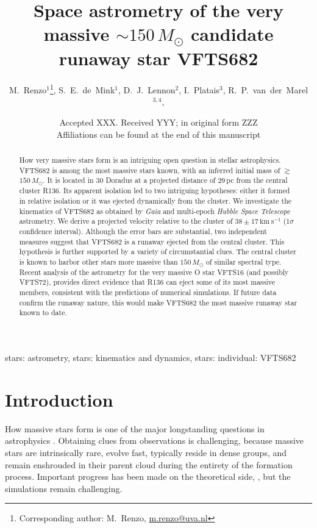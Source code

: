 \documentclass[a4paper,fleqn,usenatbib]{mnras}
\title[Space astrometry of the very massive $\sim$$150\,M_\odot$ candidate runaway star VFTS682]{Space astrometry of the very massive $\sim$$150\,M_\odot$  candidate runaway star VFTS682}
\author[Renzo et al.]{M.~Renzo$^{1}$\thanks{Corresponding author:
    M.~Renzo, \href{mailto:m.renzo@uva.nl}{m.renzo@uva.nl}}, S.~E.~de~Mink$^{1}$, D.~J.~Lennon$^{2}$, I.~Platais$^{3}$,
  R.~P.~van~der~Marel$^{3,4}$,
  \newauthor{E.~Laplace$^{1}$, J.~M.~Bestenlehner$^{5}$, C.~J.~Evans$^{6}$,
    V.~H\'enault-Brunet$^{7}$,  S.~Justham$^{8,9,1}$,
  }
\newauthor{A.~de~Koter$^{1}$,
      N.~Langer$^{10}$, F. Najarro$^{11}$, H.~Sana$^{12}$, F.~R.~N.~Schneider$^{13}$, J.~S.~Vink$^{14}$}}
\date{Accepted XXX. Received YYY; in original form ZZZ \\ Affiliations
can be found at the end of this manuscript}
\newcommand{\kms}{{\,\mathrm{km\ s^{-1}}}}
\begin{document}
\label{firsxtpage}
\pagerange{\pageref{firstpage}--\pageref{lastpage}}
\maketitle

\begin{abstract}
 
How very massive stars form is an intriguing open question in
stellar astrophysics.  VFTS682 is among the most massive stars known,
with an inferred initial mass of $\gtrsim$$150\,M_\odot$. It is located
in 30 Doradus at a projected distance of 29\,pc from the central
cluster R136. 
Its apparent isolation led to two intriguing hypotheses: 
either it formed in relative isolation 
or it was ejected dynamically from the cluster. 
We investigate the kinematics of
VFTS682 as obtained by \emph{Gaia} and multi-epoch \emph{Hubble Space Telescope} astrometry. We derive a projected velocity relative to
the cluster of $38\pm17\kms$ ($1\sigma$ confidence interval). Although
the error bars are substantial, two independent measures
suggest that VFTS682 is a runaway
ejected from the central cluster. This hypothesis is further supported by a variety of
circumstantial clues. The central cluster is known to harbor 
other stars more massive than $150\,M_\odot$ of similar spectral
type. Recent analysis of the astrometry for the very massive O star VFTS16 (and possibly VFTS72), provides
direct evidence that R136 can eject some of its
most massive members, consistent with the predictions of numerical
simulations. If future data confirm the runaway nature, this would make VFTS682
the most massive runaway star known to date. 
\end{abstract}

\begin{keywords}
  stars: astrometry, stars: kinematics and dynamics, stars: individual: VFTS682
\end{keywords}

\section{Introduction}
\label{sec:intro}

How massive stars form is one of the major longstanding questions in astrophysics
\citep[e.g.,][]{zinnecker:07}. %
%
Obtaining clues from observations is challenging, because massive stars are intrinsically rare, 
evolve fast, typically reside in dense groups, and remain enshrouded in
their parent cloud during the entirety of the formation
process. Important progress has been made on the theoretical side,
\citep[e.g.][]{bate:09,kuiper:15,rosen:16}, but the simulations %
remain challenging.  
\end{document}
